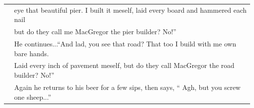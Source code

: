 \documentclass{article} %
\begin{document}
\begin{table} [h]
\begin{tabular}{c | l}
     & eye that beautiful pier. I built it meself, laid every board
       and hammered each nail \\
     & but do they call me MacGregor the pier builder? No!'' \\
     & He continues...``And lad, you see that road? That too I build with me
       own bare hands. \\
     & Laid every inch of pavement meself, but do they
       call MacGregor the road builder? No!''\\
     & Again he returns to his beer for a few sips, then says,
       `` Agh, but you screw  one sheep...''\\
\hline \hline
\end{tabular}
\label{joketexts}
\end{table}
\end{document}
